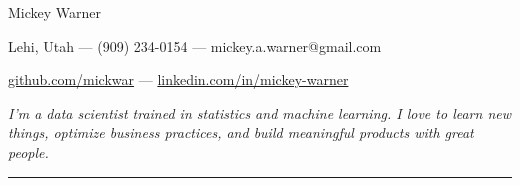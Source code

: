 \documentclass[12pt]{article}
\begin{document}

\begin{center}
\begin{Huge}
Mickey Warner
\end{Huge}
\end{center}

\hspace{85pt} Lehi, Utah --- (909) 234-0154 --- mickey.a.warner@gmail.com

\hspace{85pt} \href{https://www.github.com/mickwar}{github.com/mickwar} --- \href{https://www.linkedin.com/in/mickey-warner/}{linkedin.com/in/mickey-warner}
\smallskip
\smallskip
\smallskip
\smallskip
\smallskip

\emph{I'm a data scientist trained in statistics and machine learning. I love to learn new things, optimize business practices, and build meaningful products with great people.}
\smallskip
\bigskip

\hrule

\bigskip
\end{document}
